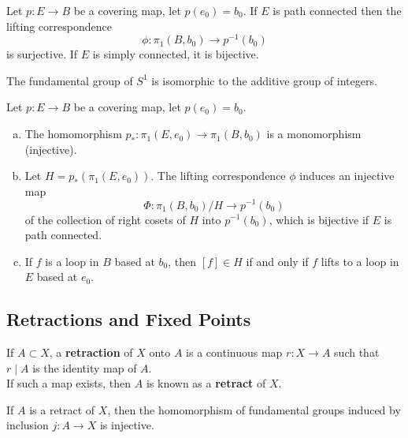 \begin{theorem}
Let $p\colon E \rightarrow B$ be a covering map, let $p(e_0) = b_0$. If $E$ is path connected then the lifting correspondence 
\[
    \phi\colon \pi _1(B, b_0) \rightarrow p^{-1}(b_0)
\]
is surjective. If $E$ is simply connected, it is bijective.
\end{theorem}

\begin{theorem}
The fundamental group of $S^1$ is isomorphic to the additive group of integers.
\end{theorem}

\begin{theorem}
Let $p\colon E \rightarrow B$ be a covering map, let $p(e_0) = b_0$.
\begin{enumerate}[a)]
    \item The homomorphism $p_{\ast} \colon \pi _1(E, e_0) \rightarrow \pi _1(B, b_0)$ is a monomorphism (injective).
    \item Let $H = p_{\ast} (\pi _1(E, e_0))$. The lifting correspondence $\phi$ induces an injective map
    \[
        \Phi\colon \pi _1(B, b_0) / H \rightarrow p^{-1}(b_0)
    \]
    of the collection of right cosets of $H$ into $p^{-1}(b_0)$, which is bijective if $E$ is path connected.
    \item If $f$ is a loop in $B$ based at $b_0$, then $[f] \in H$ if and only if $f$ lifts to a loop in $E$ based at $e_0$.
\end{enumerate}
\end{theorem}


\subsection{Retractions and Fixed Points}

\begin{definition}
If $A \subset X$, a \textbf{retraction} of $X$ onto $A$ is a continuous map $r\colon X \rightarrow  A$ such that $r \mid A$ is the identity map of $A$. \\

If such a map exists, then $A$ is known as a \textbf{retract} of $X$.
\end{definition}

\begin{lemma}
If $A$ is a retract of $X$, then the homomorphism of fundamental groups induced by inclusion $j\colon A \rightarrow X$ is injective.
\end{lemma}

